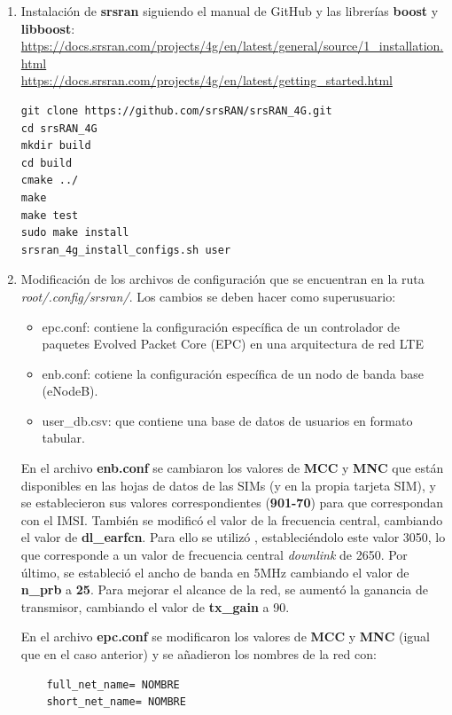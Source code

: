 \begin{enumerate}
\item Instalación de \textbf{srsran} siguiendo el manual de GitHub y las librerías \textbf{boost} y \textbf{libboost}:\\
\url{https://docs.srsran.com/projects/4g/en/latest/general/source/1_installation.html}\\
\url{https://docs.srsran.com/projects/4g/en/latest/getting_started.html}

\begin{lstlisting}
git clone https://github.com/srsRAN/srsRAN_4G.git
cd srsRAN_4G
mkdir build
cd build
cmake ../
make
make test
sudo make install
srsran_4g_install_configs.sh user
\end{lstlisting}

\item Modificación de los archivos de configuración que se encuentran en la ruta \textit{root/.config/srsran/}. Los cambios se deben hacer como superusuario:
\begin{itemize}
	\item epc.conf: contiene la configuración específica de un controlador de paquetes Evolved Packet Core (EPC) en una arquitectura de red LTE 
	\item enb.conf: cotiene la configuración específica de un nodo de banda base (eNodeB).
	\item user_db.csv: que contiene una base de datos de usuarios en formato tabular.
\end{itemize}

En el archivo \textbf{enb.conf} se cambiaron los valores de \textbf{MCC} y \textbf{MNC} que están disponibles en las hojas de datos de las SIMs (y en la propia tarjeta SIM), y se establecieron sus valores correspondientes (\textbf{901-70}) para que correspondan con el IMSI. También se modificó el valor de la frecuencia central, cambiando el valor de \textbf{dl_earfcn}. Para ello se utilizó \cite{earn}, estableciéndolo este valor 3050, lo que corresponde a un valor de frecuencia central \textit{downlink} de 2650.  Por último, se estableció el ancho de banda en 5MHz cambiando el valor de \textbf{n_prb} a \textbf{25}. Para mejorar el alcance de la red, se aumentó la ganancia de transmisor, cambiando el valor de \textbf{tx_gain} a 90.

En el archivo \textbf{epc.conf} se modificaron los valores de \textbf{MCC} y \textbf{MNC} (igual que en el caso anterior) y se añadieron los nombres de la red con:
\begin{lstlisting}
    full_net_name= NOMBRE
    short_net_name= NOMBRE
\end{lstlisting}


\end{enumerate}
